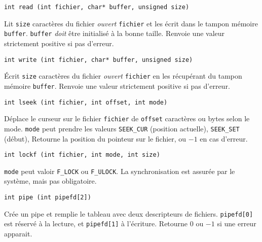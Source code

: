 \documentclass[9pt,a4paper,twocolumn]{article}
\begin{document}
    \begin{lstlisting}
int read (int fichier, char* buffer, unsigned size)
    \end{lstlisting}
    Lit \texttt{size} caractères du fichier \emph{ouvert} \texttt{fichier} et les écrit dans le tampon mémoire \texttt{buffer}.
    \texttt{buffer} \emph{doit} être initialisé à la bonne taille. 
    Renvoie une valeur strictement positive si pas d'erreur.

    \begin{lstlisting}
int write (int fichier, char* buffer, unsigned size)
    \end{lstlisting}
    Écrit \texttt{size} caractères du fichier \emph{ouvert} \texttt{fichier} en les récupérant du tampon mémoire \texttt{buffer}.
    Renvoie une valeur strictement positive si pas d'erreur.

    \begin{lstlisting}
int lseek (int fichier, int offset, int mode)
    \end{lstlisting}
    D\'eplace le curseur sur le fichier \texttt{fichier} de \texttt{offset} caractères ou bytes selon le mode.
    \texttt{mode} peut prendre les valeurs \texttt{SEEK\_CUR} (position actuelle), \texttt{SEEK\_SET} (début),
    Retourne la position du pointeur sur le fichier, ou $-1$ en cas d'erreur.

    \begin{lstlisting}
int lockf (int fichier, int mode, int size)
    \end{lstlisting}
    \texttt{mode} peut valoir \texttt{F\_LOCK} ou \texttt{F\_ULOCK}.
    La synchronisation est assurée par le système, mais pas obligatoire.

\begin{lstlisting}
int pipe (int pipefd[2])
\end{lstlisting}

Crée un pipe et remplie le tableau avec deux descripteurs de fichiers. \texttt{pipefd[0]} est réservé à la lecture, et \texttt{pipefd[1]} à l'écriture.
Retourne $0$ ou $-1$ si une erreur apparait.
\end{document}

